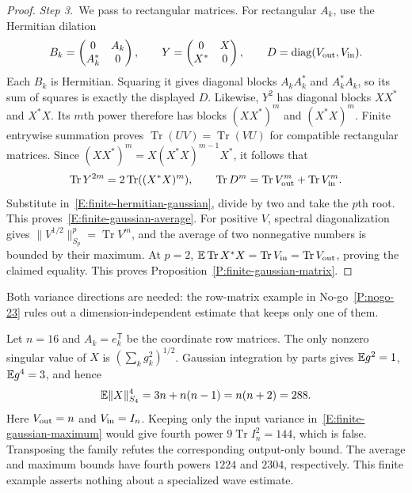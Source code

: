 \begin{proof}
  \medskip
  \noindent\textit{Step 3.~}We pass to rectangular matrices.
  For rectangular $A_k$, use the Hermitian dilation
  \[
    B_k=\begin{pmatrix}0&A_k\\A_k^*&0\end{pmatrix},\qquad
    Y=\begin{pmatrix}0&X\\X^*&0\end{pmatrix},\qquad
    D=\operatorname{diag}(V_{\rm out},V_{\rm in}).
  \]
  Each $B_k$ is Hermitian. Squaring it gives diagonal blocks $A_kA_k^*$ and
  $A_k^*A_k$, so its sum of squares is exactly the displayed $D$. Likewise,
  $Y^2$ has diagonal blocks $XX^*$ and $X^*X$. Its $m$th power therefore has
  blocks $(XX^*)^m$ and $(X^*X)^m$.
  Finite entrywise summation proves $\operatorname{Tr}(UV) =
  \operatorname{Tr}(VU)$ for compatible rectangular matrices. Since $(XX^*)^m =
  X(X^*X)^{m-1}X^*$, it follows that
  \[
    \operatorname{Tr}Y^{2m}=2\operatorname{Tr}((X^*X)^m),\qquad
    \operatorname{Tr}D^m=\operatorname{Tr}V_{\rm out}^m+
    \operatorname{Tr}V_{\rm in}^m.
  \]
  Substitute in~\eqref{E:finite-hermitian-gaussian}, divide by two and take the
  $p$th root. This proves~\eqref{E:finite-gaussian-average}. For positive $V$,
  spectral diagonalization gives $\|V^{1/2}\|_{S_p}^p = \operatorname{Tr}V^m$,
  and the average of two nonnegative numbers is bounded by their maximum. At $p
  = 2$, $\mathbb{E}\operatorname{Tr}X^*X = \operatorname{Tr}V_{\rm in} =
  \operatorname{Tr}V_{\rm out}$, proving the claimed equality. This proves
  Proposition~\ref{P:finite-gaussian-matrix}.
\end{proof}

Both variance directions are needed: the row-matrix example in
No-go~\ref{P:nogo-23} rules out a dimension-independent estimate that
keeps only one of them.


\begin{remark}
  \label{R:gaussian-one-variance-test}
  Let $n = 16$ and $A_k = e_k^{\mathsf{T}}$ be the coordinate row matrices. The
  only nonzero singular value of $X$ is $(\sum_k g_k^2)^{1/2}$. Gaussian
  integration by parts gives $\mathbb{E} g^2 = 1$, $\mathbb{E} g^4 = 3$, and hence
  \[
    \mathbb{E}\|X\|_{S_4}^4=3n+n(n-1)=n(n+2)=288.
  \]
  Here $V_{\rm out} = n$ and $V_{\rm in} = I_n$. Keeping only the input variance
  in~\eqref{E:finite-gaussian-maximum} would give fourth power
  $9\operatorname{Tr}I_n^2 = 144$, which is false. Transposing the family
  refutes the corresponding output-only bound. The average and maximum bounds
  have fourth powers $1224$ and $2304$, respectively. This finite example
  asserts nothing about a specialized wave estimate.
\end{remark}

